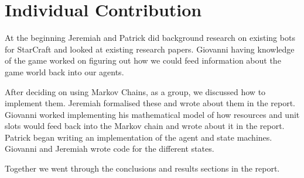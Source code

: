 \section{Individual Contribution}

At the beginning Jeremiah and Patrick did background research on existing bots for StarCraft and looked at existing research papers. Giovanni having knowledge of the game worked on figuring out how we could feed information about the game world back into our agents. 

After deciding on using Markov Chains, as a group, we discussed how to implement them. Jeremiah formalised these and wrote about them in the report. Giovanni worked implementing his mathematical model of how resources and unit slots would feed back into the Markov chain and wrote about it in the report. Patrick began writing an implementation of the agent and state machines. Giovanni and Jeremiah wrote code for the different states.

Together we went through the conclusions and results sections in the report.